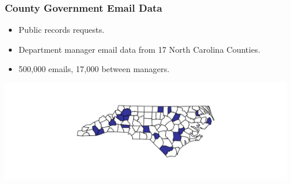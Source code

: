 \documentclass[xcolor={table}]{beamer}
\begin{document}
\begin{frame}\frametitle{County Government Email Data}
	\Large
	\begin{itemize}
		\item Public records requests.
		\vspace*{.1in}
		\item Department manager email data from 17 North Carolina Counties.
		\vspace*{.1in}
		\item 500,000 emails, 17,000 between managers.
		\vspace*{.1in}
	\end{itemize}
	\centering
	\includegraphics[width=0.95\textwidth]{images/County_Map.pdf}
\end{frame}
\end{document}
